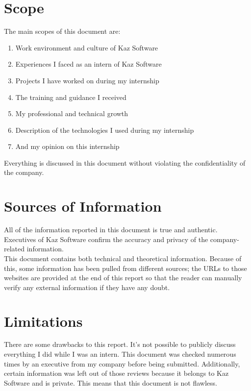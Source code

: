 \section{Scope}

The main scopes of this document are:

\begin{enumerate}
    \item Work environment and culture of Kaz Software
    \item Experiences I faced as an intern of Kaz Software
    \item Projects I have worked on during my internship
    \item The training and guidance I received
    \item My professional and technical growth
    \item Description of the technologies I used during my internship
    \item And my opinion on this internship
\end{enumerate}

Everything is discussed in this document without violating the confidentiality of the company.

\section{Sources of Information}

All of the information reported in this document is true and authentic.
Executives of Kaz Software confirm the accuracy and privacy of the company-related information.\\

This document contains both technical and theoretical information.
Because of this, some information has been pulled from different sources; the URLs to those websites are provided at the end of this report so that the reader can manually verify any external information if they have any doubt.

\section{Limitations}

There are some drawbacks to this report.
It's not possible to publicly discuss everything I did while I was an intern.
This document was checked numerous times by an executive from my company before being submitted.
Additionally, certain information was left out of those reviews because it belongs to Kaz Software and is private.
This means that this document is not flawless.